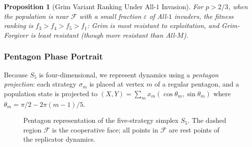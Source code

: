 \documentclass[12pt,a4paper]{article}
\newtheorem{proposition}{Proposition}[section]
\begin{document}
\begin{proposition}[Grim Variant Ranking Under All-$1$ Invasion]
For $p>2/3$, when the population is near $\mathcal{F}$ with a small fraction
$\varepsilon$ of All-$1$ invaders, the fitness ranking is
$f_3>f_4>f_5>f_1$: Grim is most resistant to exploitation, and Grim-Forgiver
is least resistant (though more resistant than All-$M$).
\end{proposition}

\subsubsection*{Pentagon Phase Portrait}

Because $S_5$ is four-dimensional, we represent dynamics using a
\emph{pentagon projection}: each strategy $\sigma_m$ is placed at vertex $m$
of a regular pentagon, and a population state is projected to
$(X,Y)=\sum_m x_m(\cos\theta_m, \sin\theta_m)$ where $\theta_m = \pi/2 - 2\pi(m-1)/5$.

\begin{figure}[H]
  \centering
  \caption{Pentagon representation of the five-strategy simplex $S_5$.
           The dashed region $\mathcal{F}$ is the cooperative face; all points
           in $\mathcal{F}$ are rest points of the replicator dynamics.}
  \label{fig:v3_pentagon}
\end{figure}
\end{document}
